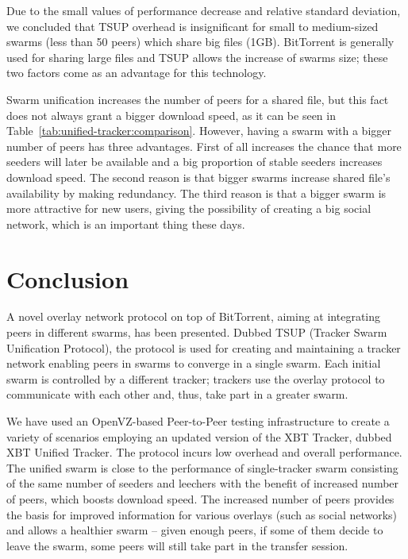 Due to the small values of performance decrease and relative standard
deviation, we concluded that TSUP overhead is insignificant for small to
medium-sized swarms (less than 50 peers) which share big files (1GB).
BitTorrent is generally used for sharing large files and TSUP allows the
increase of swarms size; these two factors come as an advantage for this
technology.

Swarm unification increases the number of peers for a shared file, but this
fact does not always grant a bigger download speed, as it can be seen in
Table~\ref{tab:unified-tracker:comparison}. However, having a swarm with a
bigger number of peers has three advantages. First of all increases the chance
that more seeders will later be available and a big proportion of stable
seeders increases download speed. The second reason is that bigger swarms
increase shared file's availability by making redundancy. The third reason is
that a bigger swarm is more attractive for new users, giving the possibility
of creating a big social network, which is an important thing these days.

\section{Conclusion}
\label{sec:unified-tracker:conclusion}

A novel overlay network protocol on top of BitTorrent, aiming at integrating
peers in different swarms, has been presented. Dubbed TSUP (Tracker Swarm
Unification Protocol), the protocol is used for creating and maintaining a
tracker network enabling peers in swarms to converge in a single swarm. Each
initial swarm is controlled by a different tracker; trackers use the overlay
protocol to communicate with each other and, thus, take part in a greater
swarm.

We have used an OpenVZ-based Peer-to-Peer testing infrastructure to create a
variety of scenarios employing an updated version of the XBT Tracker, dubbed
XBT Unified Tracker. The protocol incurs low overhead and overall performance.
The unified swarm is close to the performance of single-tracker swarm
consisting of the same number of seeders and leechers with the benefit of
increased number of peers, which boosts download speed. The increased number of peers provides the basis
for improved information for various overlays (such as social networks) and
allows a healthier swarm -- given enough peers, if some of them decide to
leave the swarm, some peers will still take part in the transfer session.

